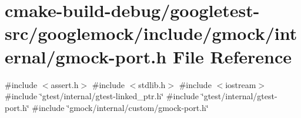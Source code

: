 \hypertarget{gmock-port_8h}{}\section{cmake-\/build-\/debug/googletest-\/src/googlemock/include/gmock/internal/gmock-\/port.h File Reference}
\label{gmock-port_8h}
{\ttfamily \#include $<$assert.\+h$>$}\newline
{\ttfamily \#include $<$stdlib.\+h$>$}\newline
{\ttfamily \#include $<$iostream$>$}\newline
{\ttfamily \#include \char`\"{}gtest/internal/gtest-\/linked\+\_\+ptr.\+h\char`\"{}}\newline
{\ttfamily \#include \char`\"{}gtest/internal/gtest-\/port.\+h\char`\"{}}\newline
{\ttfamily \#include \char`\"{}gmock/internal/custom/gmock-\/port.\+h\char`\"{}}\newline
